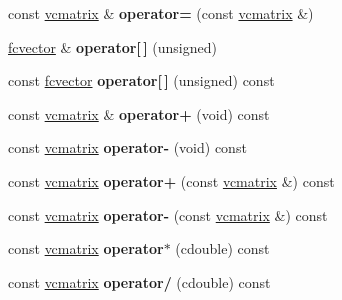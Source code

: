 \begin{DoxyCompactItemize}
\item 
const \hyperlink{classvcmatrix}{vcmatrix} \& {\bfseries operator=} (const \hyperlink{classvcmatrix}{vcmatrix} \&)\hypertarget{classvcmatrix_a103b69d126bfa5a35b818fcebbacfe54}{}\label{classvcmatrix_a103b69d126bfa5a35b818fcebbacfe54}

\item 
\hyperlink{classfcvector}{fcvector} \& {\bfseries operator\mbox{[}$\,$\mbox{]}} (unsigned)\hypertarget{classvcmatrix_aa480b1a6f4501145c7b2c35d9d93e3f8}{}\label{classvcmatrix_aa480b1a6f4501145c7b2c35d9d93e3f8}

\item 
const \hyperlink{classfcvector}{fcvector} {\bfseries operator\mbox{[}$\,$\mbox{]}} (unsigned) const \hypertarget{classvcmatrix_ade232b53427ddc24668e403d4c695ab4}{}\label{classvcmatrix_ade232b53427ddc24668e403d4c695ab4}

\item 
const \hyperlink{classvcmatrix}{vcmatrix} \& {\bfseries operator+} (void) const \hypertarget{classvcmatrix_a5661090b57306736593ee34be8e953fe}{}\label{classvcmatrix_a5661090b57306736593ee34be8e953fe}

\item 
const \hyperlink{classvcmatrix}{vcmatrix} {\bfseries operator-\/} (void) const \hypertarget{classvcmatrix_ad25d99be77567215e3d093b5d8c82502}{}\label{classvcmatrix_ad25d99be77567215e3d093b5d8c82502}

\item 
const \hyperlink{classvcmatrix}{vcmatrix} {\bfseries operator+} (const \hyperlink{classvcmatrix}{vcmatrix} \&) const \hypertarget{classvcmatrix_a2396877049e0c77babe8940c3f2072ef}{}\label{classvcmatrix_a2396877049e0c77babe8940c3f2072ef}

\item 
const \hyperlink{classvcmatrix}{vcmatrix} {\bfseries operator-\/} (const \hyperlink{classvcmatrix}{vcmatrix} \&) const \hypertarget{classvcmatrix_a3099504cabc4641fe808f20ac483590b}{}\label{classvcmatrix_a3099504cabc4641fe808f20ac483590b}

\item 
const \hyperlink{classvcmatrix}{vcmatrix} {\bfseries operator$\ast$} (cdouble) const \hypertarget{classvcmatrix_a253da3862e7201448c9c66c2fcd24214}{}\label{classvcmatrix_a253da3862e7201448c9c66c2fcd24214}

\item 
const \hyperlink{classvcmatrix}{vcmatrix} {\bfseries operator/} (cdouble) const \hypertarget{classvcmatrix_a5c62e8c634efec4496a916969b6cd90c}{}\label{classvcmatrix_a5c62e8c634efec4496a916969b6cd90c}


\end{DoxyCompactItemize}
